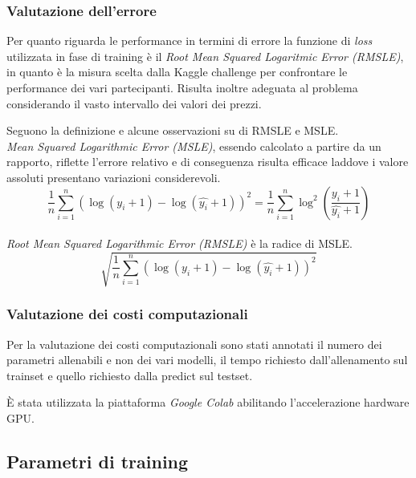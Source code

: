 \subsubsection{Valutazione dell'errore}

Per quanto riguarda le performance in termini di errore la funzione di
\textit{loss} utilizzata in fase di training è il \textit{Root Mean Squared
Logaritmic Error (RMSLE)}, in quanto è la misura scelta dalla Kaggle challenge
per confrontare le performance dei vari partecipanti. Risulta inoltre
adeguata al problema considerando il vasto intervallo dei valori dei prezzi.

Seguono la definizione e alcune osservazioni su di RMSLE e MSLE.
\\
\textit{Mean Squared Logarithmic Error (MSLE)}, essendo calcolato a partire
da un rapporto, riflette l'errore relativo e di conseguenza risulta efficace
laddove i valore assoluti presentano variazioni considerevoli.
\begin{equation}
    \frac{1}{n}
        \sum_{i=1}^{n}
            ( \log(y_i+1) - \log(\hat{y_i}+1) )^2
    =
    \frac{1}{n}
        \sum_{i=1}^{n}
            \log^2(\frac{y_i+1}{\hat{y_i}+1})
\end{equation}
\\
\textit{Root Mean Squared Logarithmic Error (RMSLE)} è la radice di MSLE.
\begin{equation}
    \sqrt{ 
        \frac{1}{n}
            \sum_{i=1}^{n}
                ( \log(y_i+1) - \log(\hat{y_i}+1) )^2
    }
\end{equation}



\subsubsection{Valutazione dei costi computazionali}

Per la valutazione dei costi computazionali sono stati annotati il numero dei
parametri allenabili e non dei vari modelli, il tempo richiesto dall'allenamento
sul trainset e quello richiesto dalla predict sul testset.

È stata utilizzata la piattaforma \textit{Google Colab} abilitando l'accelerazione hardware GPU.


\subsection{Parametri di training}

